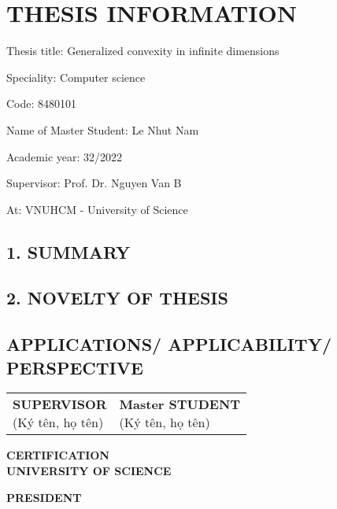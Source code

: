 \chapter*{THESIS INFORMATION}

\begin{flushleft}
Thesis title: Generalized convexity in infinite dimensions

Speciality: Computer science

Code: 8480101

Name of Master Student: Le Nhut Nam

Academic year: 32/2022

Supervisor: Prof. Dr. Nguyen Van B

At: VNUHCM - University of Science
\end{flushleft}

\section*{1. SUMMARY}
\lipsum[1-2]

\section*{2. NOVELTY OF THESIS}
\lipsum[1-2]

\section*{APPLICATIONS/ APPLICABILITY/ PERSPECTIVE}
\lipsum[1-2]

\vspace{4\baselineskip}
\begin{table}[H]
\begin{adjustbox}{max width =\textwidth}
\begin{tabular}{p{8.44cm}p{8.4cm}}
\multicolumn{1}{p{8.44cm}}{
\centering \textbf{SUPERVISOR} \newline
\centering
(Ký tên, họ tên) \newline
} &
\multicolumn{1}{p{8.4cm}}{
\centering \textbf{Master STUDENT} \newline
\centering
(Ký tên, họ tên) \newline
} \\
\end{tabular}
\end{adjustbox}
\end{table}
\vspace{2\baselineskip}
\begin{center}
    \textbf{CERTIFICATION \\ UNIVERSITY OF SCIENCE}
\end{center}
\begin{center}
    \textbf{PRESIDENT}
\end{center}
